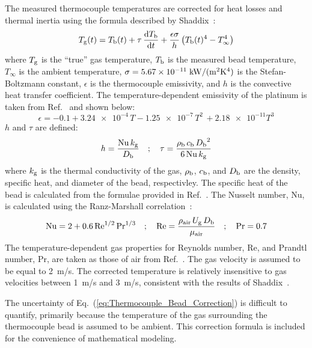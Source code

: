 \documentclass[12pt]{article}
\begin{document}
The measured thermocouple temperatures are corrected for heat losses and thermal inertia using the formula described by Shaddix~\cite{Shaddix1999}:
\begin{equation}\label{eq:Thermocouple_Bead_Correction}
   {T_{\rm g}(t)}= T_{\rm b}(t) + \tau \, \frac{{\rm d}T_{\rm b}}{{\rm d}t} + \frac{\epsilon\sigma}{h}\left(T_{\rm b}(t)^4-T_\infty^4\right)
\end{equation}
where $T_{\rm g}$ is the ``true'' gas temperature, $T_{\rm b}$ is the measured bead temperature, $T_\infty$ is the ambient temperature, $\sigma=5.67 \times 10^{-11} \; {\rm kW}/({\rm m}^2{\rm K}^4)$ is the Stefan-Boltzmann constant, $\epsilon$ is the thermocouple emissivity, and $h$ is the convective heat transfer coefficient. The temperature-dependent emissivity of the platinum is taken from Ref.~\cite{Shaddix1999} and shown below:
\begin{equation}\label{eq:epsilon}
\epsilon=-0.1+\num{3.24e-4} \, T - \num{1.25e-7} \, T^2 \, + \num{2.18e-11} T^3
\end{equation}
$h$ and $\tau$ are defined:
\begin{equation}\label{eq:h_eqn}
h=\frac{{\rm Nu} \, k_{\rm g}}{D_{\rm b}}  \quad ; \quad \tau= \frac{\rho_{\rm b} \, c_{\rm b} \, {D_{\rm b}}^2}{6 \, {\rm Nu} \, k_{\rm g}}
\end{equation}
where $k_{\rm g}$ is the thermal conductivity of the gas, $\rho_{\rm b}$, $c_{\rm b}$, and $D_{\rm b}$ are the density, specific heat, and diameter of the bead, respectivley. The specific heat of the bead is calculated from the formulae provided in Ref.~\cite{Jaeger1939}. The Nusselt number, Nu, is calculated using the Ranz-Marshall correlation~\cite{Shaddix1999}:
\begin{equation}\label{eq:Nu_number}
{\rm Nu} = 2 + 0.6 \, \textrm{Re}^{1/2} \, \textrm{Pr}^{1/3} \quad ; \quad \textrm{Re} = \frac{ \rho_{\rm air} \, U_{\rm g} \, D_{\rm b} }{\mu_{\rm air}}  \quad ; \quad \textrm{Pr}=0.7
\end{equation}
The temperature-dependent gas properties for Reynolds number, Re, and Prandtl number, Pr, are taken as those of air from Ref.~\cite{Incropera2007}. The gas velocity is assumed to be equal to 2~m/s. The corrected temperature is relatively insensitive to gas velocities between 1~m/s and 3~m/s, consistent with the results of Shaddix~\cite{Shaddix1999}.

The uncertainty of Eq.~(\ref{eq:Thermocouple_Bead_Correction}) is difficult to quantify, primarily because the temperature of the gas surrounding the thermocouple bead is assumed to be ambient. This correction formula is included for the convenience of mathematical modeling.
\end{document}
